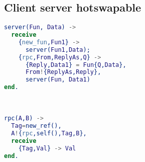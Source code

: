 \documentclass{report}
\begin{document}
\subsection{Client server hotswapable}
\begin{minipage}[t]{0.45\linewidth}
\begin{lstlisting}[language=erlang]
server(Fun, Data) -> 
  receive
    {new_fun,Fun1} -> 
      server(Fun1,Data); 
    {rpc,From,ReplyAs,Q} -> 
      {Reply,Data1} = Fun{Q,Data},
      From!{ReplyAs,Reply}, 
      server(Fun, Data1)
end.
\end{lstlisting}
\end{minipage}
%
\begin{minipage}[t]{0.45\linewidth}
\begin{lstlisting}[language=erlang]
% Fonction RPC


rpc(A,B) -> 
  Tag=new_ref(),
  A!{rpc,self(),Tag,B}, 
  receive 
    {Tag,Val} -> Val
end.
\end{lstlisting}
\end{minipage}
\end{document}
